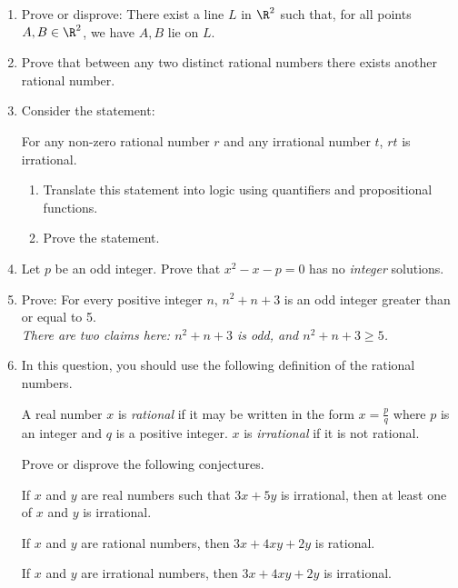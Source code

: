 \begin{enumerate}
  \item Prove or disprove: There exist a line $L$ in $\R^2$ such that, for all points $A, B \in \R^2$, we have $A, B$ lie on $L$. 

  
	\item Prove that between any two distinct rational numbers there exists another rational number.\label{ex:rationalsdenseinthemselves}
	
	  \item Consider the statement:
  \begin{center}
      For any non-zero rational number $r$ and any irrational number $t$, $rt$ is irrational.
  \end{center}
  \begin{enumerate}
      \item Translate this statement into logic using quantifiers and propositional functions.
      \item Prove the statement.
  \end{enumerate}

	\item Let $p$ be an odd integer. Prove that $x^2-x-p=0$ has no \emph{integer} solutions.
   
	\item Prove: For every positive integer $n$, $n^2+n+3$ is an odd integer greater than or equal to 5.\\
	\emph{There are two claims here: $n^2+n+3$ is odd, and $n^2+n+3\ge 5$.}
	  
	\item In this question, you should use the following definition of the rational numbers.
		\begin{defn*}
  	A real number $x$ is \emph{rational} if it may be written in the form $x=\frac pq$ where $p$ is an integer and $q$ is a positive integer. $x$ is \emph{irrational} if it is not rational.
  	\end{defn*}
  	Prove or disprove the following conjectures.
  	\begin{conj*}[1]
			If $x$ and $y$ are real numbers such that $3x+5y$ is irrational, then at least one of $x$ and $y$ is irrational.
		\end{conj*}
  	\begin{conj*}[2]
			If $x$ and $y$ are rational numbers, then $3x+4xy+2y$ is rational.
		\end{conj*}
  	\begin{conj*}[3]
			If $x$ and $y$ are irrational numbers, then $3x+4xy+2y$ is irrational.
		\end{conj*}
	

\end{enumerate}

